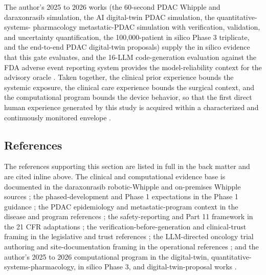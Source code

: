 The author's 2025 to 2026 works (the 60-second PDAC Whipple and daraxonrasib
simulation, the AI digital-twin PDAC simulation, the quantitative-systems-
pharmacology metastatic-PDAC simulation with verification, validation, and
uncertainty quantification, the 100,000-patient in silico Phase 3 triplicate, and
the end-to-end PDAC digital-twin proposals) supply the in silico evidence that this
gate evaluates, and the 16-LLM code-generation evaluation against the FDA adverse
event reporting system provides the model-reliability context for the advisory
oracle \cite{chatgpt100kp, pdacdigtwinp, llmcomp16fda}. Taken together, the clinical
prior experience bounds the systemic exposure, the clinical care experience bounds
the surgical context, and the computational program bounds the device behavior, so
that the first direct human experience generated by this study is acquired within a characterized and continuously monitored envelope \cite{daraxwhipple,
onpremwhippl, clintrustpai}.

\subsection{References}

The references supporting this section are listed in full in the back matter and
are cited inline above. The clinical and computational evidence base is documented
in the daraxonrasib robotic-Whipple and on-premises Whipple sources
\cite{daraxwhipple, onpremwhippl}; the phased-development and Phase 1 expectations
in the Phase 1 guidance \cite{phase1guidance}; the PDAC epidemiology and
metastatic-program context in the disease and program references
\cite{pdac060s2030}; the safety-reporting and Part 11 framework in the 21 CFR
adaptations \cite{cfr312paiuni, cfr050paiuni, ichpaistduni}; the
verification-before-generation and clinical-trust framing in the legislative and
trust references \cite{congress9510, clintrustpai}; the LLM-directed oncology trial
authoring and site-documentation framing in the operational references
\cite{oncotrialllm, paisitedocpk, paipredict4x, paiautospons, natlpaiplatf}; and the
author's 2025 to 2026 computational program in the digital-twin,
quantitative-systems-pharmacology, in silico Phase 3, and digital-twin-proposal
works \cite{fdadigtwinpc, qspmetpancre, chatgpt100kp, pdacdigtwinp, llmcomp16fda}.
